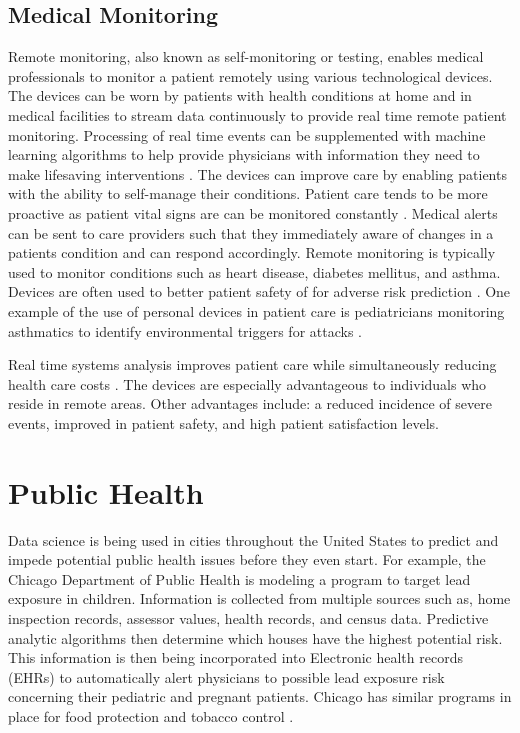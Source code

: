 \documentclass[sigconf]{acmart}
\begin{document}
{\subsection{Medical Monitoring} 
Remote monitoring, also known as self-monitoring or testing, enables medical professionals to monitor a patient remotely using various technological devices. The devices can be worn by patients with health conditions at home and in medical facilities to stream data continuously to provide real time remote patient monitoring.  Processing of real time events can be supplemented with machine learning algorithms to help provide physicians with information they need to make lifesaving interventions \cite{www-google-McDonald}.  The devices can improve care by enabling patients with the ability to self-manage their conditions. Patient care tends to be more proactive as patient vital signs are can be monitored constantly \cite{www-google-McDonald}. Medical alerts can be sent to care providers such that they immediately aware of changes in a patients condition and can respond accordingly.  Remote monitoring is typically used to monitor conditions such as heart disease, diabetes mellitus, and asthma. Devices are often used to better patient safety of for adverse risk prediction \cite{www-google-McDonald}.  One example of the use of personal devices in patient care is pediatricians monitoring asthmatics to identify environmental triggers for attacks \cite{www-google-CIO}. 

Real time systems analysis improves patient care while simultaneously reducing health care costs \cite{www-google-christian}.  The devices are especially advantageous to individuals who reside in remote areas. Other advantages include: a reduced incidence of severe events, improved in patient safety, and high patient satisfaction levels.
 

\section{Public Health}
Data science is being used in cities throughout the United States to predict and impede potential public health issues before they even start.  For example, the Chicago Department of Public Health is modeling a program to target lead exposure in children.  Information is collected from multiple sources such as, home inspection records, assessor values, health records, and census data.  Predictive analytic algorithms then determine which houses have the highest potential risk.  This information is then being incorporated into Electronic health records (EHRs) to automatically alert physicians to possible lead exposure risk concerning their pediatric and pregnant patients.  Chicago has similar programs in place for food protection and tobacco control \cite{www-google-chicago}.

}
\end{document}
